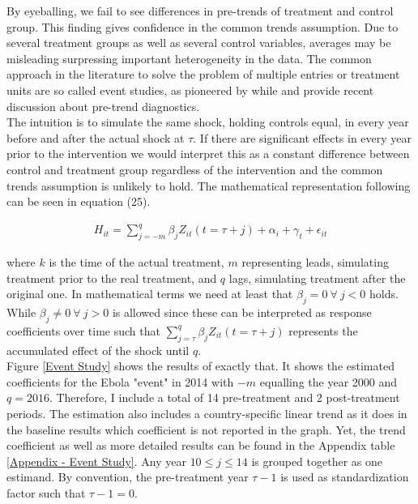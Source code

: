 \documentclass{article}
\begin{document}
By eyeballing, we fail to see differences in pre-trends of treatment and control group. This finding gives confidence in the common trends assumption. Due to several treatment groups as well as several control variables, averages may be misleading surpressing important heterogeneity in the data. The common approach in the literature to solve the problem of multiple entries or treatment units are so called event studies, as pioneered by \cite{bertrand2004much} while \cite{freyal2018pre} and
\cite{borusyak2017revisiting} provide recent discussion about pre-trend diagnostics. \\
The intuition is to simulate the same shock, holding controls equal, in every year before and after the actual shock at $\tau$. If there are significant effects in every year prior to the intervention we would interpret this as a constant difference between control and treatment group regardless of the intervention and the common trends assumption is unlikely to hold. The mathematical representation following \cite{pischke2005empirical} can be seen in equation (25).

\begin{align}
H_{it} =  \sum_{j=-m}^q \beta_j Z_{it}(t = \tau + j) + \alpha_i + \gamma_t + \epsilon_{it}
\end{align}

where $k$ is the time of the actual treatment, $m$ representing leads, simulating treatment prior to the real treatment, and $q$ lags, simulating treatment after the original one. In mathematical terms we need at least that $\beta_j = 0 \ \forall \ j < 0$ holds. While $\beta_j \neq 0 \ \forall \ j > 0$ is allowed since these can be interpreted as response coefficients over time such that $\sum_{j= \tau}^q \beta_j Z_{it}(t = \tau + j)$ represents the accumulated effect of the shock until $q$. \\
Figure \ref{Event Study} shows the results of exactly that. It shows the estimated coefficients for the Ebola "event" in 2014 with $-m$ equalling the year 2000 and $q = 2016$. Therefore, I include a total of 14 pre-treatment and 2 post-treatment periods. The estimation also includes a country-specific linear trend as it does in the baseline results which coefficient is not reported in the graph. Yet, the trend coefficient as well as more detailed results can be found in the Appendix table \ref{Appendix - Event Study}. Any year $10 \leqslant j \leqslant 14 $ is grouped together as one estimand. By convention, the pre-treatment year $\tau - 1$ is used as standardization factor such that $\tau - 1 = 0$.
\end{document}
